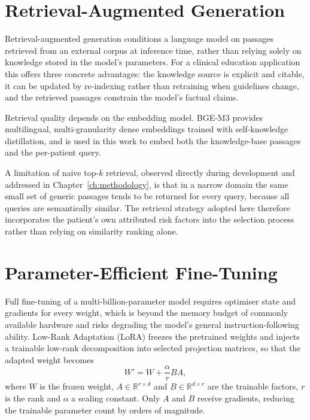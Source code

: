 \section{Retrieval-Augmented Generation}
\label{sec:rag_lit}

Retrieval-augmented generation \cite{lewis2020} conditions a language model on
passages retrieved from an external corpus at inference time, rather than
relying solely on knowledge stored in the model's parameters. For a clinical
education application this offers three concrete advantages: the knowledge
source is explicit and citable, it can be updated by re-indexing rather than
retraining when guidelines change, and the retrieved passages constrain the
model's factual claims.

Retrieval quality depends on the embedding model. BGE-M3 \cite{chen2024bgem3}
provides multilingual, multi-granularity dense embeddings trained with
self-knowledge distillation, and is used in this work to embed both the
knowledge-base passages and the per-patient query.

A limitation of naive top-$k$ retrieval, observed directly during development
and addressed in Chapter~\ref{ch:methodology}, is that in a narrow domain the
same small set of generic passages tends to be returned for every query,
because all queries are semantically similar. The retrieval strategy adopted
here therefore incorporates the patient's own attributed risk factors into the
selection process rather than relying on similarity ranking alone.

\section{Parameter-Efficient Fine-Tuning}
\label{sec:peft_lit}

Full fine-tuning of a multi-billion-parameter model requires optimiser state and
gradients for every weight, which is beyond the memory budget of commonly
available hardware and risks degrading the model's general instruction-following
ability. Low-Rank Adaptation (LoRA) \cite{hu2022lora} freezes the pretrained
weights and injects a trainable low-rank decomposition into selected projection
matrices, so that the adapted weight becomes
\begin{equation}
W' = W + \frac{\alpha}{r} B A ,
\label{eq:lora_lit}
\end{equation}
where $W$ is the frozen weight, $A \in \mathbb{R}^{r \times d}$ and
$B \in \mathbb{R}^{d \times r}$ are the trainable factors, $r$ is the rank and
$\alpha$ a scaling constant. Only $A$ and $B$ receive gradients, reducing the
trainable parameter count by orders of magnitude.

